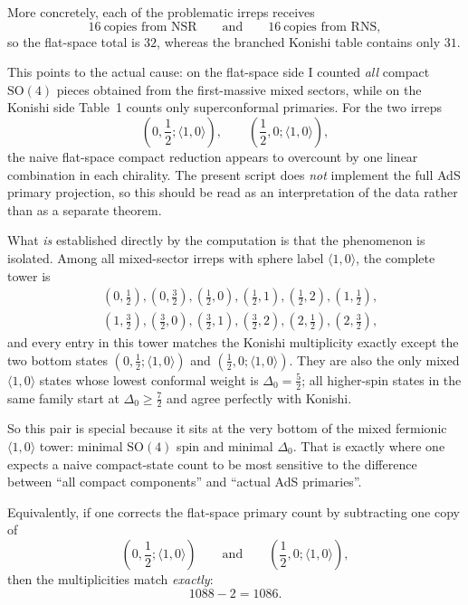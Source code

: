 \documentclass[12pt]{article}
\newcommand{\SO}{\mathrm{SO}}
\newcommand{\la}{\langle}
\newcommand{\ra}{\rangle}
\newcommand{\half}{\frac{1}{2}}
\begin{document}
More concretely, each of the problematic irreps receives
\begin{equation}
16\ \text{copies from NSR} \qquad\text{and}\qquad 16\ \text{copies from RNS},
\end{equation}
so the flat-space total is $32$, whereas the branched Konishi table contains only $31$.

This points to the actual cause: on the flat-space side I counted \emph{all} compact
$\SO(4)$ pieces obtained from the first-massive mixed sectors, while on the Konishi side
Table~1 counts only superconformal primaries. For the two irreps
\begin{equation}
(0,\half;\la 1,0\ra),\qquad (\half,0;\la 1,0\ra),
\end{equation}
the naive flat-space compact reduction appears to overcount by one linear combination in each
chirality. The present script does \emph{not} implement the full AdS primary projection, so this
should be read as an interpretation of the data rather than as a separate theorem.

What \emph{is} established directly by the computation is that the phenomenon is isolated.
Among all mixed-sector irreps with sphere label $\la 1,0\ra$, the complete tower is
\begin{equation}
\begin{aligned}
&(0,\half),(0,\tfrac32),(\half,0),(\half,1),(\half,2),(1,\half),\\
&(1,\tfrac32),(\tfrac32,0),(\tfrac32,1),(\tfrac32,2),(2,\half),(2,\tfrac32),
\end{aligned}
\end{equation}
and every entry in this tower matches the Konishi multiplicity exactly except the two bottom
states $(0,\half;\la 1,0\ra)$ and $(\half,0;\la 1,0\ra)$.
They are also the only mixed $\la 1,0\ra$ states whose lowest conformal weight is
$\Delta_0=\frac52$; all higher-spin states in the same family start at $\Delta_0\ge \frac72$ and
agree perfectly with Konishi.

So this pair is special because it sits at the very bottom of the mixed fermionic
$\la 1,0\ra$ tower: minimal $\SO(4)$ spin and minimal $\Delta_0$.
That is exactly where one expects a naive compact-state count to be most sensitive to the
difference between ``all compact components'' and ``actual AdS primaries''.

Equivalently, if one corrects the flat-space primary count by subtracting one copy of
\begin{equation}
(0,\half;\la 1,0\ra)\qquad\text{and}\qquad (\half,0;\la 1,0\ra),
\end{equation}
then the multiplicities match \emph{exactly}:
\begin{equation}
1088-2=1086.
\end{equation}
\end{document}
